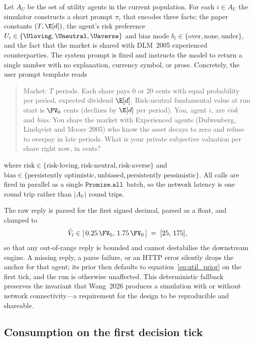 Let $A_U$ be the set of utility agents in the current population.
For each $i\in A_U$ the simulator constructs a short prompt
$\pi_i$ that encodes three facts: the paper constants $(T,\E[d])$,
the agent's risk preference $U_i\in\{\Uloving,\Uneutral,\Uaverse\}$
and bias mode $b_i\in\{\text{over},\text{none},\text{under}\}$, and
the fact that the market is shared with DLM~2005 experienced
counterparties. The system prompt is fixed and instructs the model
to return a single number with no explanation, currency symbol, or
prose. Concretely, the user prompt template reads
\begin{quote}\small
Market: $T$ periods. Each share pays 0 or 20 cents with equal
probability per period, expected dividend $\E[d]$. Risk-neutral
fundamental value at run start is $\FV_0$ cents (declines by
$\E[d]$ per period). You, agent $i$, are \emph{risk} and
\emph{bias}. You share the market with Experienced agents
(Dufwenberg, Lindqvist and Moore 2005) who know the asset decays
to zero and refuse to overpay in late periods. What is your
private subjective valuation per share right now, in cents?
\end{quote}
where $\text{risk}\in\{\text{risk-loving},\text{risk-neutral},
\text{risk-averse}\}$ and $\text{bias}\in\{\text{persistently
optimistic},\text{unbiased},\text{persistently pessimistic}\}$. All
calls are fired in parallel as a single
$\texttt{Promise.all}$~batch, so the network latency is one round
trip rather than $|A_U|$ round trips.

The raw reply is parsed for the first signed decimal, parsed as a
float, and clamped to
\begin{equation}
\hat{V}_i\in[\,0.25\,\FV_0,\,1.75\,\FV_0\,]\;=\;[25,\,175],
\label{eq:clamp}
\end{equation}
so that any out-of-range reply is bounded and cannot destabilise
the downstream engine. A missing reply, a parse failure, or an HTTP
error silently drops the anchor for that agent; its prior then
defaults to equation~\eqref{eq:util_prior} on the first tick, and
the run is otherwise unaffected. This deterministic fallback
preserves the invariant that Wang~2026 produces a simulation with
or without network connectivity---a requirement for the design to be
reproducible and shareable.

\subsection{Consumption on the first decision tick}

